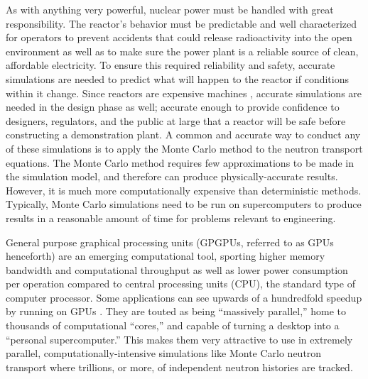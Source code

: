As with anything very powerful, nuclear power must be handled with great responsibility.  The reactor's behavior must be predictable and well characterized for operators to prevent accidents that could release radioactivity into the open environment as well as to make sure the power plant is a reliable source of clean, affordable electricity.  To ensure this required reliability and safety, accurate simulations are needed to predict what will happen to the reactor if conditions within it change.  Since reactors are  expensive machines \cite{nuclear_cost}, accurate simulations are needed in the design phase as well; accurate enough to provide confidence to designers, regulators, and the public at large that a reactor will be safe before constructing a demonstration plant.  A common and accurate way to conduct any of these simulations is to apply the Monte Carlo method to the neutron transport equations.  The Monte Carlo method requires few approximations to be made in the simulation model, and therefore can produce  physically-accurate results.  However, it is much more computationally expensive than deterministic methods.  Typically, Monte Carlo simulations need to be run on supercomputers to produce results in a reasonable amount of time for problems relevant to engineering.

General purpose graphical processing units (GPGPUs, referred to as GPUs henceforth) are an emerging computational tool, sporting higher memory bandwidth and computational throughput as well as lower power consumption per operation compared to central processing units (CPU), the standard type of computer processor.  Some applications can see upwards of a hundredfold speedup by running on GPUs \cite{nvidia_speedups}.  They are touted as being ``massively parallel,'' home to thousands of computational ``cores,'' and capable of turning a desktop into a ``personal supercomputer.''  This makes them very attractive to use in extremely parallel, computationally-intensive simulations like Monte Carlo neutron transport where trillions, or more, of independent neutron histories are tracked.   

